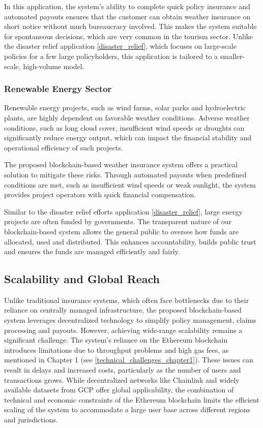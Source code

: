 In this application, the system's ability to complete quick policy insurance and automated payouts ensures that the customer can obtain weather insurance on short notice without much bureaucracy involved. This makes the system suitable for spontaneous decisions, which are very common in the tourism sector. Unlike the disaster relief application \cref{disaster_relief}, which focuses on large-scale policies for a few large policyholders, this application is tailored to a smaller-scale, high-volume model.

\subsubsection{Renewable Energy Sector}
Renewable energy projects, such as wind farms, solar parks and hydroelectric plants, are highly dependent on favorable weather conditions. Adverse weather conditions, such as long cloud cover, insufficient wind speeds or droughts can significantly reduce energy output, which can impact the financial stability and operational efficiency of such projects.

The proposed blockchain-based weather insurance system offers a practical solution to mitigate these risks. Through automated payouts when predefined conditions are met, such as insufficient wind speeds or weak sunlight, the system provides project operators with quick financial compensation.

Similar to the disaster relief efforts application \cref{disaster_relief}, large energy projects are often funded by governments. The transparent nature of our blockchain-based system allows the general public to oversee how funds are allocated, used and distributed. This enhances accountability, builds public trust and ensures the funds are managed efficiently and fairly.

\subsection{Scalability and Global Reach}\label{scalability_global_reach}
Unlike traditional insurance systems, which often face bottlenecks due to their reliance on centrally managed infrastructure, the proposed blockchain-based system leverages decentralized technology to simplify policy management, claims processing and payouts. However, achieving wide-range scalability remains a significant challenge. The system's reliance on the Ethereum blockchain introduces limitations due to throughput problems and high gas fees, as mentioned in Chapter 1 (see \cref{technical_challenges_chapter1}). These issues can result in delays and increased costs, particularly as the number of users and transactions grows. While decentralized networks like Chainlink and widely available datasets from GCP offer global applicability, the combination of technical and economic constraints of the Ethereum blockchain limits the efficient scaling of the system to accommodate a large user base across different regions and jurisdictions.

